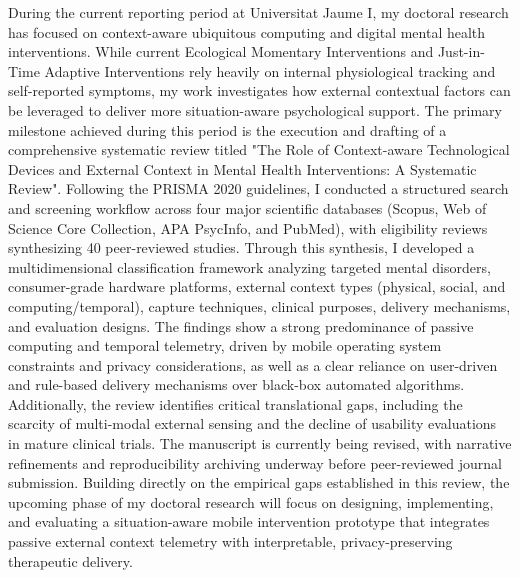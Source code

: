 During the current reporting period at Universitat Jaume I, my doctoral research has focused on context-aware ubiquitous computing and digital mental health interventions. While current Ecological Momentary Interventions and Just-in-Time Adaptive Interventions rely heavily on internal physiological tracking and self-reported symptoms, my work investigates how external contextual factors can be leveraged to deliver more situation-aware psychological support.
The primary milestone achieved during this period is the execution and drafting of a comprehensive systematic review titled "The Role of Context-aware Technological Devices and External Context in Mental Health Interventions: A Systematic Review". Following the PRISMA 2020 guidelines, I conducted a structured search and screening workflow across four major scientific databases (Scopus, Web of Science Core Collection, APA PsycInfo, and PubMed), with eligibility reviews synthesizing 40 peer-reviewed studies.
Through this synthesis, I developed a multidimensional classification framework analyzing targeted mental disorders, consumer-grade hardware platforms, external context types (physical, social, and computing/temporal), capture techniques, clinical purposes, delivery mechanisms, and evaluation designs.
The findings show a strong predominance of passive computing and temporal telemetry, driven by mobile operating system constraints and privacy considerations, as well as a clear reliance on user-driven and rule-based delivery mechanisms over black-box automated algorithms.
Additionally, the review identifies critical translational gaps, including the scarcity of multi-modal external sensing and the decline of usability evaluations in mature clinical trials.
The manuscript is currently being revised, with narrative refinements and reproducibility archiving underway before peer-reviewed journal submission. Building directly on the empirical gaps established in this review, the upcoming phase of my doctoral research will focus on designing, implementing, and evaluating a situation-aware mobile intervention prototype that integrates passive external context telemetry with interpretable, privacy-preserving therapeutic delivery.
